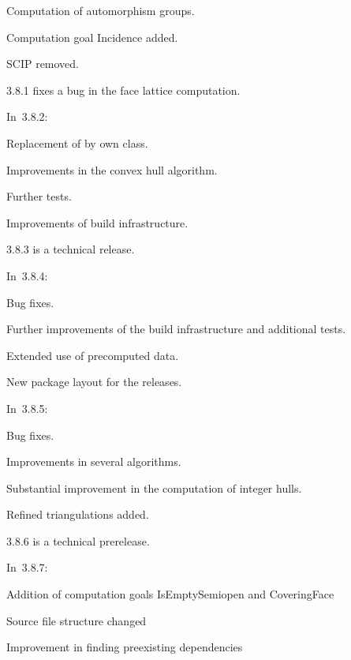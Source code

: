 \begin{arab}
	\item Computation of automorphism groups.
	\item Computation goal Incidence added.
	\item SCIP removed.
\end{arab}

3.8.1 fixes a bug in the face lattice computation.

In~3.8.2:

\begin{arab}
	\item Replacement of  by own class.
	\item Improvements in the convex hull algorithm.
	\item Further tests.
	\item Improvements of build infrastructure.
\end{arab}

3.8.3 is a technical release.

In~3.8.4:

\begin{arab}
	\item Bug fixes.
	\item Further improvements of the build infrastructure and additional tests.
	\item Extended use of precomputed data.
	\item New package layout for the releases.
\end{arab}

In~3.8.5:

\begin{arab}
	\item Bug fixes.
	\item Improvements in several algorithms.
	\item Substantial improvement in the computation of integer hulls.
	\item Refined triangulations added.
\end{arab}

3.8.6 is a technical prerelease.

In~3.8.7:

\begin{arab}
	\item Addition of computation goals IsEmptySemiopen and CoveringFace
	\item Source file structure changed
	\item Improvement in finding preexisting dependencies
\end{arab}

